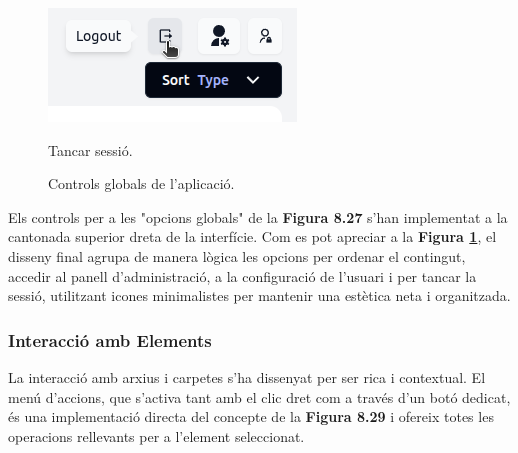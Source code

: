 \begin{figure}[H]
    \begin{minipage}{0.24\textwidth}
        \centering
        \includegraphics[width=\linewidth]{Figures/ui-web/logout_button.png}
        \caption{Tancar sessió.}
    \end{minipage}
    \caption{Controls globals de l'aplicació.}
    \label{fig:react-global-controls-impl}
\end{figure}

Els controls per a les "opcions globals" de la \textbf{Figura 8.27} s'han implementat a la cantonada superior dreta de la interfície. Com es pot apreciar a la \textbf{Figura \ref{fig:react-global-controls-impl}}, el disseny final agrupa de manera lògica les opcions per ordenar el contingut, accedir al panell d'administració, a la configuració de l'usuari i per tancar la sessió, utilitzant icones minimalistes per mantenir una estètica neta i organitzada.

\subsubsection{Interacció amb Elements}
La interacció amb arxius i carpetes s'ha dissenyat per ser rica i contextual. El menú d'accions, que s'activa tant amb el clic dret com a través d'un botó dedicat, és una implementació directa del concepte de la \textbf{Figura 8.29} i ofereix totes les operacions rellevants per a l'element seleccionat.

